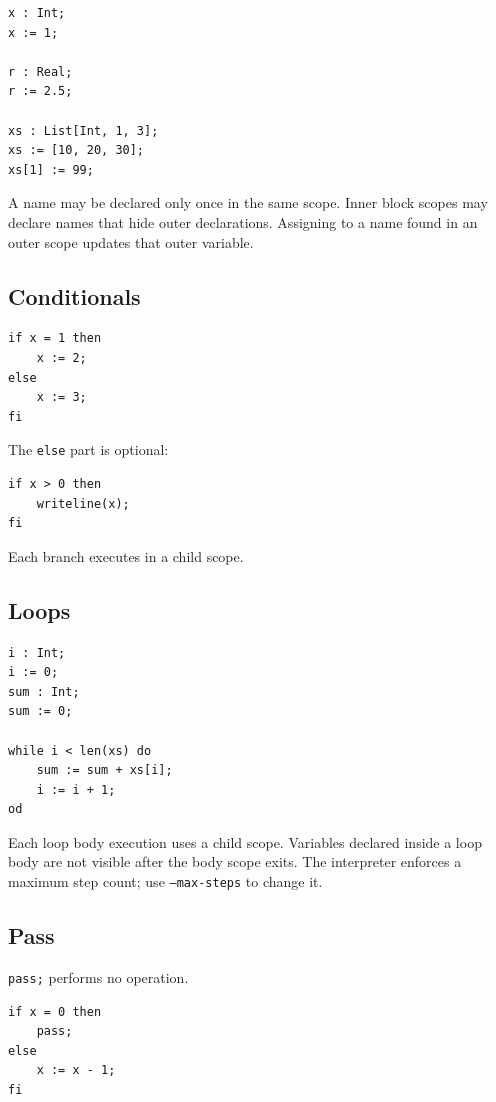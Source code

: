 \documentclass[11pt]{article}
\begin{document}
\begin{lstlisting}
x : Int;
x := 1;

r : Real;
r := 2.5;

xs : List[Int, 1, 3];
xs := [10, 20, 30];
xs[1] := 99;
\end{lstlisting}

A name may be declared only once in the same scope. Inner block scopes may declare names that hide outer declarations. Assigning to a name found in an outer scope updates that outer variable.

\subsection{Conditionals}

\begin{lstlisting}
if x = 1 then
    x := 2;
else
    x := 3;
fi
\end{lstlisting}

The \texttt{else} part is optional:

\begin{lstlisting}
if x > 0 then
    writeline(x);
fi
\end{lstlisting}

Each branch executes in a child scope.

\subsection{Loops}

\begin{lstlisting}
i : Int;
i := 0;
sum : Int;
sum := 0;

while i < len(xs) do
    sum := sum + xs[i];
    i := i + 1;
od
\end{lstlisting}

Each loop body execution uses a child scope. Variables declared inside a loop body are not visible after the body scope exits. The interpreter enforces a maximum step count; use \texttt{--max-steps} to change it.

\subsection{Pass}

\texttt{pass;} performs no operation.

\begin{lstlisting}
if x = 0 then
    pass;
else
    x := x - 1;
fi
\end{lstlisting}
\end{document}
